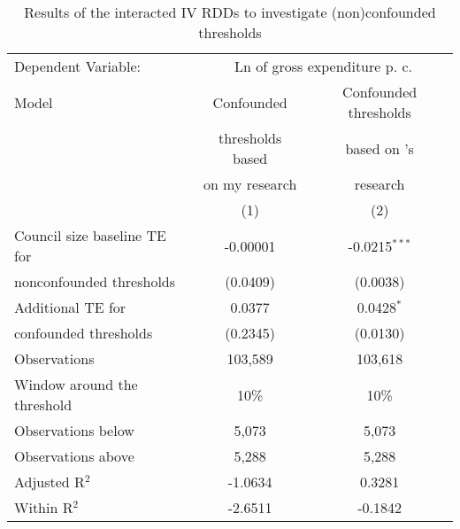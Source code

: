 
\begin{table}
   \caption{\label{tab:rdd_conf_thresholds} Results of the interacted \acs{IV} \acs{RDD}s to investigate (non)confounded thresholds}
   \centering
   \begin{tabular}{lcc}
      \toprule \midrule
      Dependent Variable: & \multicolumn{2}{c}{Ln of gross expenditure \acs{p. c.}}\\
      Model & Confounded & Confounded thresholds \\     
      & thresholds based &  based on \citeauthor{Hohmann.2017}'s \\
      & on my research &  \parencite*{Hohmann.2017} research \\
      & (1)                                        & (2)\\  
      \midrule
      Council size baseline \ac{TE} for              & -0.00001                      & -0.0215$^{***}$\\   
       \hspace{5mm} nonconfounded thresholds & (0.0409)                                   & (0.0038)\\   
      Additional \ac{TE} for                      & 0.0377                                     & 0.0428$^{*}$\\   
       \hspace{5mm} confounded thresholds    & (0.2345)                                   & (0.0130)\\   
      \midrule
      Observations                                                            & 103,589                                    & 103,618\\  
      Window around the threshold                                             & 10\%                                       & 10\%\\   
      Observations below                                                      & 5,073                                      & 5,073\\  
      Observations above                                                      & 5,288                                      & 5,288\\  
      Adjusted R$^2$                                                                   & -1.0634                                    & 0.3281\\  
      Within R$^2$                                                            & -2.6511                                    & -0.1842\\  
      \midrule \bottomrule
   \end{tabular}
   

\end{table}
